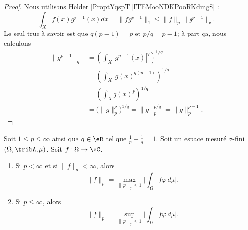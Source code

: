 \begin{proof}
	Nous utilisons Hölder \ref{ProptYqspT}\ref{ITEMooNDKPooRKdmgS} :
	\begin{equation}
		\int_Xf(x)g^{p-1}(x)dx=\| fg^{p-1} \|_1\leq \| f \|_p\| g^{p-1} \|_q.
	\end{equation}
	Le seul truc à savoir est que \( q(p-1)=p\) et \( p/q=p-1\); à part ça, nous calculons
	\begin{subequations}
		\begin{align}
			\| g^{p-1} \|_q & =\left(  \int_X| g^{p-1}(x) |^q  \right)^{1/q}                                                                  \\
			                & =\left(  \int_X| g(x)^{q(p-1)}  \right)^{1/q}                                                                   \\
			                & =\left(\int_Xg(x)^p\right)^{1/q}                                                                                \\
			                & =\Big( \| g \|_p^p \Big)^{1/q}                 =\| g \|_p^{p/q}                               =\| g \|_p^{p-1}.
		\end{align}
	\end{subequations}
\end{proof}


\begin{proposition}	\label{PROPooYOWUooXoNLbL}
	Soit \( 1\leq p\leq \infty\) ainsi que \( q\in \eR\) tel que \( \frac{1}{ p}+\frac{1}{ q}=1\). Soit un espace mesuré \( \sigma\)-fini \( (\Omega,\tribA,\mu)\). Soit \(f \colon \Omega\to \eC  \).
	\begin{enumerate}
		\item		\label{ITEMooONTQooMHHOxk}
		      Si \( p<\infty\) et si \( \| f \|_p<\infty\), alors
		      \begin{equation}
			      \| f \|_p=\max_{\| \varphi \|_q\leq 1}\big|  \int_{\Omega}f\varphi\,d\mu \big|.
		      \end{equation}
		\item	\label{ITEMooBZXAooAfgWvF}
		      Si \( p\leq\infty\), alors
		      \begin{equation}
			      \| f \|_p=\sup_{\| \varphi \|_q\leq 1}\big|  \int_{\Omega}f\varphi\,d\mu \big|.
		      \end{equation}
	\end{enumerate}
\end{proposition}


